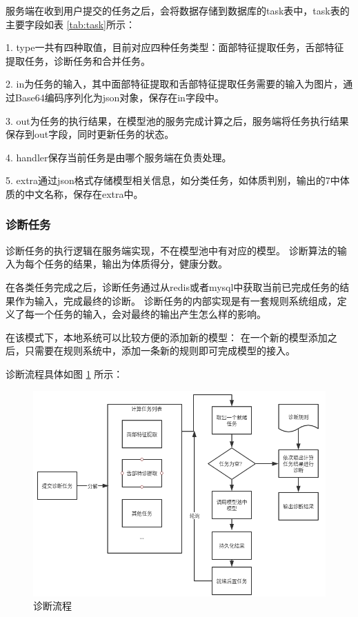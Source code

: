 服务端在收到用户提交的任务之后，会将数据存储到数据库的task表中，task表的主要字段如表 \ref{tab:task}所示：

1. type一共有四种取值，目前对应四种任务类型：面部特征提取任务，舌部特征提取任务，诊断任务和合并任务。

2. in为任务的输入，其中面部特征提取和舌部特征提取任务需要的输入为图片，通过Base64编码序列化为json对象，保存在in字段中。

3. out为任务的执行结果，在模型池的服务完成计算之后，服务端将任务执行结果保存到out字段，同时更新任务的状态。

4. handler保存当前任务是由哪个服务端在负责处理。

5. extra通过json格式存储模型相关信息，如分类任务，如体质判别，输出的7中体质的中文名称，保存在extra中。


\subsubsection{诊断任务}


诊断任务的执行逻辑在服务端实现，不在模型池中有对应的模型。 诊断算法的输入为每个任务的结果，输出为体质得分，健康分数。

在各类任务完成之后，诊断任务通过从redis或者mysql中获取当前已完成任务的结果作为输入，完成最终的诊断。 
诊断任务的内部实现是有一套规则系统组成，定义了每一个任务的输入，会对最终的输出产生怎么样的影响。

在该模式下，本地系统可以比较方便的添加新的模型： 在一个新的模型添加之后，只需要在规则系统中，添加一条新的规则即可完成模型的接入。

诊断流程具体如图 \ref{fig:sketch} 所示：

\begin{figure}[ht]
    \centering
    \includegraphics[width=12cm]{images/sketch.png}
    \caption{诊断流程}
    \label{fig:sketch}
\end{figure}

